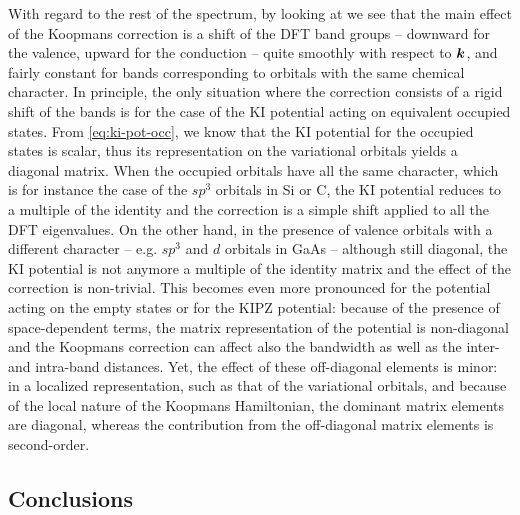 With regard to the rest of the spectrum, by looking at  we see that the main effect of the Koopmans correction is a shift of the DFT band groups -- downward for the valence, upward for the conduction -- quite smoothly with respect to ${\bm k}$, and fairly constant for bands corresponding to orbitals with the same chemical character. In principle, the only situation where the correction consists of a rigid shift of the bands is for the case of the KI potential acting on equivalent occupied states. From \cref{eq:ki-pot-occ}, we know that the KI potential for the occupied states is scalar, thus its representation on the variational orbitals yields a diagonal matrix. When the occupied orbitals have all the same character, which is for instance the case of the $sp^3$ orbitals in Si or C, the KI potential reduces to a multiple of the identity and the correction is a simple shift applied to all the DFT eigenvalues. On the other hand, in the presence of valence orbitals with a different character -- e.g. $sp^3$ and $d$ orbitals in GaAs -- although still diagonal, the KI potential is not anymore a multiple of the identity matrix and the effect of the correction is non-trivial. This becomes even more pronounced for the potential acting on the empty states or for the KIPZ potential: because of the presence of space-dependent terms, the matrix representation of the potential is non-diagonal and the Koopmans correction can affect also the bandwidth as well as the inter- and intra-band distances. Yet, the effect of these off-diagonal elements is minor: in a localized representation, such as that of the variational orbitals, and because of the local nature of the Koopmans Hamiltonian, the dominant matrix elements are diagonal, whereas the contribution from the off-diagonal matrix elements is second-order.

\subsection{Conclusions}

